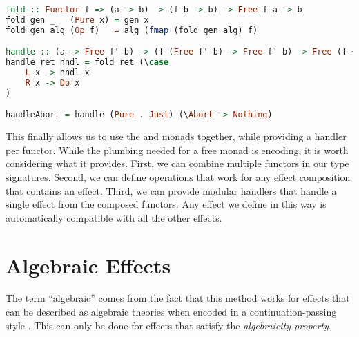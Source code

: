 \begin{lstlisting}[language=haskell,style=fancy]
fold :: Functor f => (a -> b) -> (f b -> b) -> Free f a -> b
fold gen _   (Pure x) = gen x
fold gen alg (Op f)   = alg (fmap (fold gen alg) f)

handle :: (a -> Free f' b) -> (f (Free f' b) -> Free f' b) -> Free (f + f') a -> Free f' b
handle ret hndl = fold ret (\case
    L x -> hndl x
    R x -> Do x
)

handleAbort = handle (Pure . Just) (\Abort -> Nothing)
\end{lstlisting}

This finally allows us to use the  and  monads together, while providing a handler per functor. While the plumbing needed for a free monad is encoding, it is worth considering what it provides. First, we can combine multiple functors in our type signatures. Second, we can define operations that work for any effect composition that contains an effect. Third, we can provide modular handlers that handle a single effect from the composed functors. Any effect we define in this way is automatically compatible with all the other effects.

\section{Algebraic Effects}

The term ``algebraic'' comes from the fact that this method works for effects that can be described as algebraic theories when encoded in a continuation-passing style \autocite{goos_adequacy_2001}. This can only be done for effects that satisfy the \emph{algebraicity property}.

